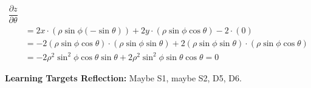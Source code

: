 \documentclass[10pt]{article}
\newenvironment{red}{\color{red}}{\ignorespacesafterend}
\begin{document}
\begin{enumerate}[leftmargin=0pt]
\begin{enumerate}
\begin{red}
\begin{align*}
            \dfrac{\partial z}{\partial\theta} \\
            &= 2x\cdot(\rho\sin\phi(-\sin\theta)) 
            + 2y\cdot(\rho\sin\phi\cos\theta)
            -2 \cdot (0) \\
            &= -2(\rho\sin\phi\cos\theta)\cdot(\rho\sin\phi\sin\theta) 
            +2(\rho\sin\phi\sin\theta)\cdot(\rho\sin\phi\cos\theta) \\
            &= -2\rho^2\sin^2\phi\cos\theta\sin\theta + 2\rho^2\sin^2\phi\sin\theta\cos\theta = 0
        \end{align*}
        \end{red}
    \end{enumerate}
\end{enumerate}

\begin{red}
\textbf{Learning Targets Reflection:} Maybe S1, maybe S2, D5, D6.
\end{red}
\end{document}
